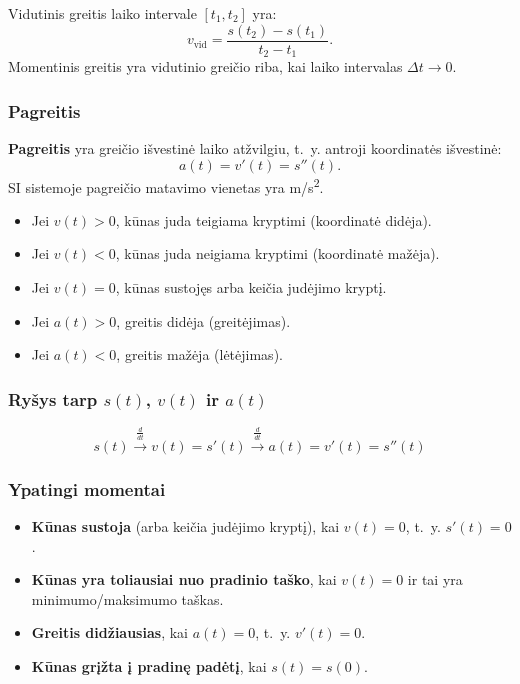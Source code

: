 \begin{remark}
Vidutinis greitis laiko intervale $[t_1, t_2]$ yra:
\[
    v_{\text{vid}} = \frac{s(t_2) - s(t_1)}{t_2 - t_1}.
\]
Momentinis greitis yra vidutinio greičio riba, kai laiko intervalas $\Delta t \to 0$.
\end{remark}

\subsubsection*{Pagreitis}

\begin{definition}[Pagreitis]
\textbf{Pagreitis} yra greičio išvestinė laiko atžvilgiu, t.~y. antroji koordinatės
išvestinė:
\[
    a(t) = v'(t) = s''(t).
\]
SI sistemoje pagreičio matavimo vienetas yra m/s\textsuperscript{2}.
\end{definition}

\begin{remark}
\begin{itemize}
    \item Jei $v(t) > 0$, kūnas juda teigiama kryptimi (koordinatė didėja).
    \item Jei $v(t) < 0$, kūnas juda neigiama kryptimi (koordinatė mažėja).
    \item Jei $v(t) = 0$, kūnas sustojęs arba keičia judėjimo kryptį.
    \item Jei $a(t) > 0$, greitis didėja (greitėjimas).
    \item Jei $a(t) < 0$, greitis mažėja (lėtėjimas).
\end{itemize}
\end{remark}

\subsubsection*{Ryšys tarp $s(t)$, $v(t)$ ir $a(t)$}

\[
\boxed{
s(t)
\xrightarrow{\displaystyle \frac{d}{dt}}
v(t) = s'(t)
\xrightarrow{\displaystyle \frac{d}{dt}}
a(t) = v'(t) = s''(t)
}
\]

\subsubsection*{Ypatingi momentai}

\begin{itemize}
    \item \textbf{Kūnas sustoja} (arba keičia judėjimo kryptį), kai $v(t) = 0$, t.~y. $s'(t) = 0$.
    \item \textbf{Kūnas yra toliausiai nuo pradinio taško}, kai $v(t) = 0$ ir tai yra minimumo/maksimumo taškas.
    \item \textbf{Greitis didžiausias}, kai $a(t) = 0$, t.~y. $v'(t) = 0$.
    \item \textbf{Kūnas grįžta į pradinę padėtį}, kai $s(t) = s(0)$.
\end{itemize}

